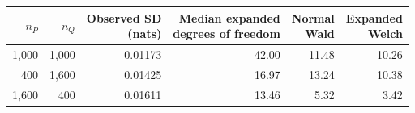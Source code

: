 \begin{tabular}{@{}rrrrrr@{}}
\toprule
\(n_P\) & \(n_Q\) & \shortstack{Observed SD\\(nats)} & \shortstack{Median expanded\\degrees of freedom} & \shortstack{Normal\\Wald} & \shortstack{Expanded\\Welch}\\
\midrule
1,000 & 1,000 & 0.01173 & 42.00 & 11.48 & 10.26\\
400 & 1,600 & 0.01425 & 16.97 & 13.24 & 10.38\\
1,600 & 400 & 0.01611 & 13.46 & 5.32 & 3.42\\
\bottomrule
\end{tabular}
